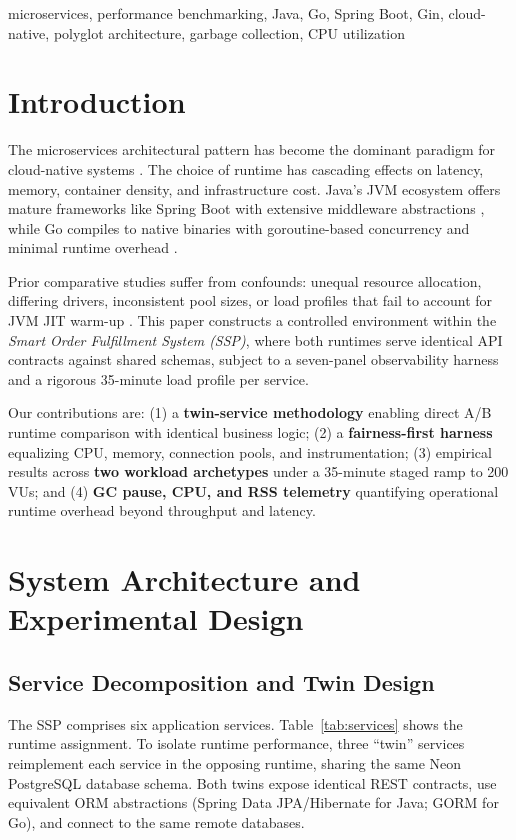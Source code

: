 \documentclass[conference]{IEEEtran}
\begin{document}
\begin{IEEEkeywords}
microservices, performance benchmarking, Java, Go, Spring Boot, Gin, cloud-native, polyglot architecture, garbage collection, CPU utilization
\end{IEEEkeywords}

\section{Introduction}

The microservices architectural pattern has become the dominant paradigm for cloud-native systems \cite{b1}. The choice of runtime has cascading effects on latency, memory, container density, and infrastructure cost. Java's JVM ecosystem offers mature frameworks like Spring Boot with extensive middleware abstractions \cite{b2}, while Go compiles to native binaries with goroutine-based concurrency and minimal runtime overhead \cite{b3}.

Prior comparative studies suffer from confounds: unequal resource allocation, differing drivers, inconsistent pool sizes, or load profiles that fail to account for JVM JIT warm-up \cite{b4}. This paper constructs a controlled environment within the \textit{Smart Order Fulfillment System (SSP)}, where both runtimes serve identical API contracts against shared schemas, subject to a seven-panel observability harness and a rigorous 35-minute load profile per service.

Our contributions are: (1) a \textbf{twin-service methodology} enabling direct A/B runtime comparison with identical business logic; (2) a \textbf{fairness-first harness} equalizing CPU, memory, connection pools, and instrumentation; (3) empirical results across \textbf{two workload archetypes} under a 35-minute staged ramp to 200 VUs; and (4) \textbf{GC pause, CPU, and RSS telemetry} quantifying operational runtime overhead beyond throughput and latency.

\section{System Architecture and Experimental Design}

\subsection{Service Decomposition and Twin Design}

The SSP comprises six application services. Table~\ref{tab:services} shows the runtime assignment. To isolate runtime performance, three ``twin'' services reimplement each service in the opposing runtime, sharing the same Neon PostgreSQL database schema. Both twins expose identical REST contracts, use equivalent ORM abstractions (Spring Data JPA/Hibernate for Java; GORM for Go), and connect to the same remote databases.
\end{document}
